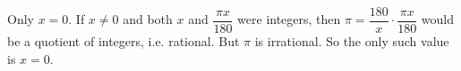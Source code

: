 Only $x=0$. If $x\ne0$ and both $x$ and $\dfrac{\pi x}{180}$ were integers, then $\pi=\dfrac{180}{x}\cdot\dfrac{\pi x}{180}$ would be a quotient of integers, i.e. rational. But $\pi$ is irrational. So the only such value is $\boxed{x=0}$.
